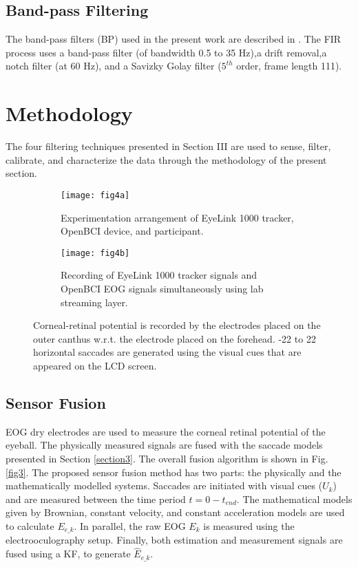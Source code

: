 \documentclass[transmag]{IEEEtran}
\begin{document}
\subsection{Band-pass Filtering}
The band-pass filters (BP) used in the present work are described in \cite{ref4}. The FIR process uses a band-pass filter (of bandwidth 0.5 to 35 \si{\hertz}),a drift removal,a notch filter (at 60 \si{\hertz}), and a Savizky Golay filter ($5^{th}$ order, frame length 111).  


\section{Methodology}
\label{section4}

The four filtering techniques presented in Section III are used to sense, filter, calibrate, and characterize the data through the methodology of the present section. 




\begin{figure*}
	\centering
	\begin{subfigure}[b]{0.474\textwidth}
		\centering
		\texttt{[image: fig4a]}
		\caption{Experimentation arrangement of EyeLink 1000 tracker, OpenBCI device, and participant. }
	\end{subfigure}
	\begin{subfigure}[b]{0.52\textwidth}
		\centering
		\texttt{[image: fig4b]}
		\caption{Recording of EyeLink 1000 tracker signals and OpenBCI EOG signals simultaneously using lab streaming layer.}
	\end{subfigure}
\caption{Corneal-retinal potential is recorded by the electrodes placed on the outer canthus w.r.t. the electrode placed on the forehead. -22 to 22 \si{\deg} horizontal saccades are generated using the visual cues that are appeared on the LCD screen.}
\label{fig4}
\end{figure*}




\subsection{Sensor Fusion}

EOG dry electrodes are used to measure the corneal retinal potential of the eyeball. The physically measured signals are fused with the saccade models presented in Section \ref{section3}. The overall fusion algorithm is shown in Fig. \ref{fig3}. The proposed sensor fusion method has two parts: the physically and the mathematically modelled systems. Saccades are initiated with visual cues ($U_k$) and are measured between the time period $t=0-t_{end}$. The mathematical models given by Brownian, constant velocity, and constant acceleration models are used to calculate $E_{e\_k}$. In parallel, the raw EOG $E_k$ is measured using the electrooculography setup. Finally, both estimation and measurement signals are fused using a KF, to generate $\hat{E}_{e\_k}$.
\end{document}
